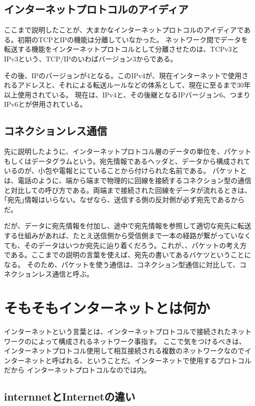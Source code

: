 \subsection{インターネットプロトコルのアイディア}

ここまで説明したことが、大まかなインターネットプロトコルのアイディアである。初期のTCPとIPの機能は分離していなかった。
ネットワーク間でデータを転送する機能をインターネットプロトコルとして分離させたのは、TCPv3とIPv3という、TCP/IPのいわばバージョン3からである。

その後、IPのバージョンが4となる。このIPv4が、現在インターネットで使用されるアドレスと、それによる転送ルールなどの体系として、現在に至るまで30年以上使用されている。
現在は、IPv4と、その後継となるIPバージョン6、つまりIPv6とが併用されている。

\subsection{コネクションレス通信}

先に説明したように、インターネットプロトコル層のデータの単位を、パケットもしくはデータグラムという。宛先情報であるヘッダと、データから構成されているのが、小包や電報とにていることから付けられた名前である。
パケットとは、電話のように、端から端まで物理的に回線を接続するコネクション型の通信と対比しての呼び方である。両端まで接続された回線をデータが流れるときは、｢宛先｣情報はいらない。なぜなら、送信する側の反対側が必ず宛先であるからだ。

だが、データに宛先情報を付加し、途中で宛先情報を参照して適切な宛先に転送する仕組みがあれば、たとえ送信側から受信側まで一本の経路が繋がっていなくても、そのデータはいつか宛先に辿り着くだろう。これが、、パケットの考え方である。ここまでの説明の言葉を使えば、宛先の書いてあるバケツということになる。
そのため、パケットを使う通信は、コネクション型通信に対比して、コネクションレス通信と呼ぶ。

\section{そもそもインターネットとは何か}

インターネットという言葉とは、インターネットプロトコルで接続されたネットワークのによって構成されるネットワーク事指す。
ここで気をつけるべきは、インターネットプロトコル使用して相互接続される複数のネットワークなのでインターネットと呼ばれる、ということだ。インターネットで使用するプロトコルだから インターネットプロトコルなのでは内。

\subsection{internnetとInternetの違い}

